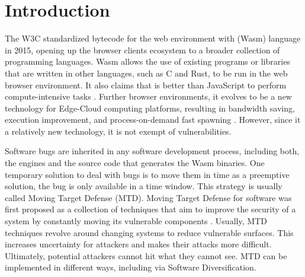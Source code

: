 \chapter{Introduction}



\newcommand{\subscript}[2]{$#1 _ #2$}

\newcommand{\rqone}{To what extent can we artifically generate program variants for WebAssembly?}

\newcommand{\rqtwo}{To what extent are the generated variants dynamically different?}
\newcommand{\rqthree}{To what extent do the artificial variants exhibit different execution times on Edge-Cloud platforms?}



The W3C standardized bytecode for the web environment with \wasm (Wasm) language in 2015, opening up the browser clients ecosystem to a broader collection of programming languages. Wasm allows the use of existing programs or libraries that are written in other languages, such as C and Rust, to be run in the web browser environment. It also claims that is better than JavaScript to perform compute-intensive tasks \cite{Haas_2017}. 
Further browser environments, it evolves to be a new technology for Edge-Cloud computing platforms, resulting in bandwidth saving, execution improvement, and process-on-demand fast spawning \cite{9640153, wen2020wasmachine}. However, since it a relatively new technology, it is not exempt of vulnerabilities.

Software bugs are inherited in any software development process, including both, the \wasm engines and the source code that generates the Wasm binaries. One temporary solution to deal with bugs is to move them in time as a preemptive solution, the bug is only available in a time window. This strategy is usually called Moving Target Defense (MTD).  Moving Target Defense for software was first proposed as a collection of techniques that aim to improve the security of a system by constantly moving its vulnerable components \cite{MTDNationalCyberLaep, okhravi2013survey}. Usually, MTD techniques revolve around changing systems to reduce vulnerable surfaces. This increases uncertainty for attackers and makes their attacks more difficult. Ultimately, potential attackers cannot hit what they cannot see. MTD can be implemented in different ways, including via Software Diversification. 

